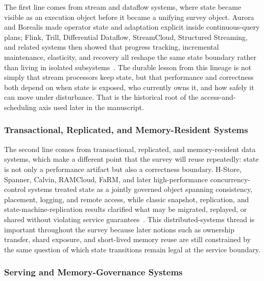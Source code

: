 \documentclass[acmsmall,screen,review]{acmart}
\begin{document}
The first line comes from stream and dataflow systems, where state became visible as an execution object before it became a unifying survey object. Aurora and Borealis made operator state and adaptation explicit inside continuous-query plans; Flink, Trill, Differential Dataflow, StreamCloud, Structured Streaming, and related systems then showed that progress tracking, incremental maintenance, elasticity, and recovery all reshape the same state boundary rather than living in isolated subsystems~\cite{abadi2003aurora,abadi2005borealis,carbone2015flink,carbone2015asynchronous,chandramouli2014trill,armbrust2018structured,murray2013differential,gulisano2012streamcloud,hirzel2014catalog,cugola2012processing}. The durable lesson from this lineage is not simply that stream processors keep state, but that performance and correctness both depend on when state is exposed, who currently owns it, and how safely it can move under disturbance. That is the historical root of the access-and-scheduling axis used later in the manuscript.

\subsubsection{Transactional, Replicated, and Memory-Resident Systems}

The second line comes from transactional, replicated, and memory-resident data systems, which make a different point that the survey will reuse repeatedly: state is not only a performance artifact but also a correctness boundary. H-Store, Spanner, Calvin, RAMCloud, FaRM, and later high-performance concurrency-control systems treated state as a jointly governed object spanning consistency, placement, logging, and remote access, while classic snapshot, replication, and state-machine-replication results clarified what may be migrated, replayed, or shared without violating service guarantees~\cite{kallman2008hstore,corbett2012spanner,thomson2012calvin,ousterhout2011ramcloud,dragojevic2014farm,ren2015drtmh,yu2016tictoc,zamanian2017endmyth,schneider1990state,chandy1985snapshot,ongaro2014raft}. This distributed-systems thread is important throughout the survey because later notions such as ownership transfer, shard exposure, and short-lived memory reuse are still constrained by the same question of which state transitions remain legal at the service boundary.

\subsubsection{Serving and Memory-Governance Systems}
\end{document}
